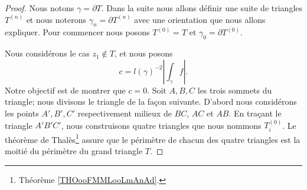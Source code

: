 \begin{proof}
	Nous notons \( \gamma=\partial T\). Dans la suite nous allons définir une suite de triangles \( T^{(n)}\) et nous noterons \( \gamma_n=\partial T^{(n)}\) avec une orientation que nous allons expliquer. Pour commencer nous posons \( T^{(0)}=T\) et \( \gamma_0=\partial T^{(0)}\).

	Nous considérons le cas \( z_1\notin T\), et nous posons
	\begin{equation}
		c=l(\gamma)^{-2}| \int_{\gamma}f |.
	\end{equation}
	Notre objectif est de montrer que \( c=0\). Soit \( A,B,C\) les trois sommets du triangle; nous divisons le triangle de la façon suivante. D'abord nous considérons les points \( A',B',C'\) respectivement milieux de \( BC\), \( AC\) et \( AB\). En traçant le triangle \( A'B'C'\), nous construisons quatre triangles que nous nommons \( T^{(0)}_i\). Le théorème de Thalès\footnote{Théorème \ref{THOooFMMLooLmAnAd}.} assure que le périmètre de chacun des quatre triangles est la moitié du périmètre du grand triangle \( T\).


\end{proof}
